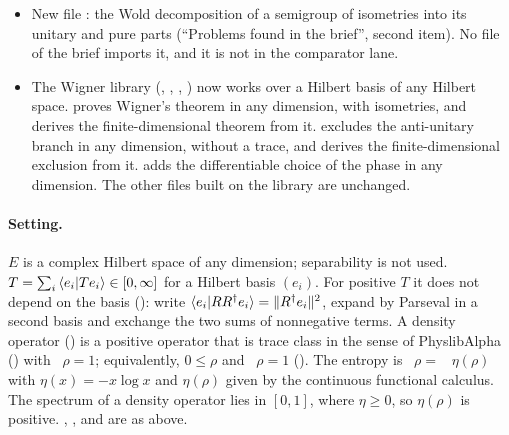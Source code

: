 \documentclass[11pt]{article}
\begin{document}
\begin{itemize}
  vector is determined by its coordinates, Parseval for their moduli, the diagonal unitary
  $b_i \mapsto \delta_i b_i$, coordinatewise conjugation, the isometry $b_i \mapsto v_i$ onto an
  orthonormal family, and $V(V^\dagger x) = x$ when $\|V^\dagger x\| = \|x\|$),\newline
  \newline (by Banach--Steinhaus,
  the strong derivative of an operator family is a bounded operator; for unitaries with
  $U(t_0) = 1$ it is skew-adjoint).
\item New  file
  : the Wold decomposition of
  a semigroup of isometries into its unitary and pure parts (``Problems found in the brief'',
  second item). No file of the brief imports it, and it is not in the comparator lane.
\item The Wigner library  (,
  , , ) now works over a Hilbert basis of any
  Hilbert space.  proves Wigner's theorem in any dimension, with isometries, and
  derives the finite-dimensional theorem from it.  excludes the anti-unitary
  branch in any dimension, without a trace, and derives the finite-dimensional exclusion from it.
   adds the differentiable choice of the phase in any dimension. The other
  files built on the library are unchanged.
\end{itemize}

\paragraph{Setting.} $E$ is a complex Hilbert space of any dimension; separability is not used.
~$T = \sum_i \braket{e_i|Te_i} \in [0,\infty]$ for a Hilbert basis $(e_i)$. For
positive $T$ it does not depend on the basis (): write
$\braket{e_i|RR^\dagger e_i} = \|R^\dagger e_i\|^2$, expand by Parseval in a second basis and
exchange the two sums of nonnegative terms. A density operator () is a
positive operator that is trace class in the sense of PhyslibAlpha () with
~$\rho = 1$; equivalently, $0 \le \rho$ and ~$\rho = 1$
(). The entropy is ~$\rho =$
~$\eta(\rho)$ with $\eta(x) = -x\log x$ and $\eta(\rho)$ given by the continuous
functional calculus. The spectrum of a density operator lies in $[0,1]$, where $\eta \ge 0$, so
$\eta(\rho)$ is positive. , ,  and  are as above.
\end{document}
